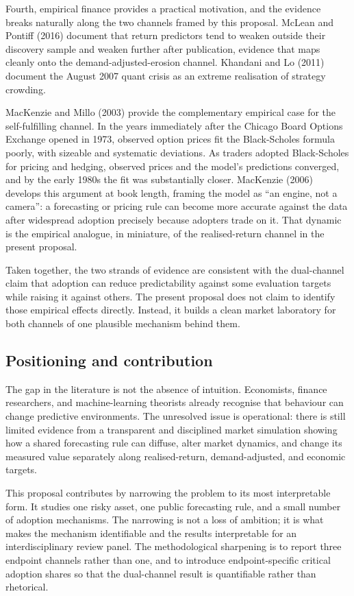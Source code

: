 \documentclass[11pt]{article}
\begin{document}
Fourth, empirical finance provides a practical motivation, and the evidence breaks naturally along the two channels framed by this proposal. McLean and Pontiff (2016) document that return predictors tend to weaken outside their discovery sample and weaken further after publication, evidence that maps cleanly onto the demand-adjusted-erosion channel. Khandani and Lo (2011) document the August 2007 quant crisis as an extreme realisation of strategy crowding.

MacKenzie and Millo (2003) provide the complementary empirical case for the self-fulfilling channel. In the years immediately after the Chicago Board Options Exchange opened in 1973, observed option prices fit the Black-Scholes formula poorly, with sizeable and systematic deviations. As traders adopted Black-Scholes for pricing and hedging, observed prices and the model's predictions converged, and by the early 1980s the fit was substantially closer. MacKenzie (2006) develops this argument at book length, framing the model as ``an engine, not a camera'': a forecasting or pricing rule can become more accurate against the data after widespread adoption precisely because adopters trade on it. That dynamic is the empirical analogue, in miniature, of the realised-return channel in the present proposal.

Taken together, the two strands of evidence are consistent with the dual-channel claim that adoption can reduce predictability against some evaluation targets while raising it against others. The present proposal does not claim to identify those empirical effects directly. Instead, it builds a clean market laboratory for both channels of one plausible mechanism behind them.

\subsection{Positioning and contribution}

The gap in the literature is not the absence of intuition. Economists, finance researchers, and machine-learning theorists already recognise that behaviour can change predictive environments. The unresolved issue is operational: there is still limited evidence from a transparent and disciplined market simulation showing how a shared forecasting rule can diffuse, alter market dynamics, and change its measured value separately along realised-return, demand-adjusted, and economic targets.

This proposal contributes by narrowing the problem to its most interpretable form. It studies one risky asset, one public forecasting rule, and a small number of adoption mechanisms. The narrowing is not a loss of ambition; it is what makes the mechanism identifiable and the results interpretable for an interdisciplinary review panel. The methodological sharpening is to report three endpoint channels rather than one, and to introduce endpoint-specific critical adoption shares so that the dual-channel result is quantifiable rather than rhetorical.
\end{document}
